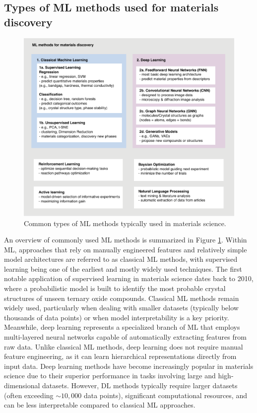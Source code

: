\subsection{Types of ML methods used for materials discovery}

\begin{figure}[ht]
    \centering
    \includegraphics[width=\textwidth]{figures/literature-review/figure2-2.pdf}
    \caption{Common types of ML methods typically used in materials science.}
    \label{fig:figure2.2}
\end{figure}

An overview of commonly used ML methods is summarized in Figure \ref{fig:figure2.2}. Within ML, approaches that rely on manually engineered features and relatively simple model architectures are referred to as classical ML methods, with supervised learning being one of the earliest and mostly widely used techniques. The first notable application of supervised learning in materials science dates back to 2010, where a probabilistic model is built to identify the most probable crystal structures of unseen ternary oxide compounds\cite{RN542}. Classical ML methods remain widely used, particularly when dealing with smaller datasets (typically below thousands of data points) or when model interpretability is a key priority. Meanwhile, deep learning represents a specialized branch of ML that employs multi-layered neural networks capable of automatically extracting features from raw data. Unlike classical ML methods, deep learning does not require manual feature engineering, as it can learn hierarchical representations directly from input data. Deep learning methods have become increasingly popular in materials science due to their superior performance in tasks involving large and high-dimensional datasets. However, DL methods typically require larger datasets (often exceeding $\sim10,000$ data points), significant computational resources, and can be less interpretable compared to classical ML approaches.

